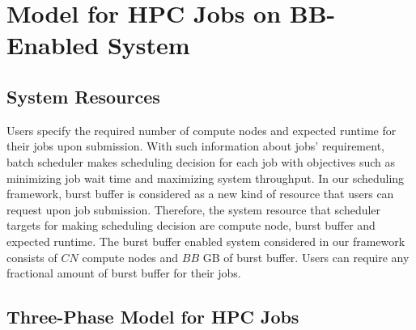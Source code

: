 \section{Model for HPC Jobs on BB-Enabled System}
\label{Sec:Model}

\subsection{System Resources}

Users specify the required number of compute nodes and expected runtime for their jobs upon submission. 
With such information about jobs' requirement, 
batch scheduler makes scheduling decision for each job with objectives 
such as minimizing job wait time and maximizing system throughput. 
In our scheduling framework, 
burst buffer is considered as a new kind of resource that users can request upon job submission. 
Therefore, the system resource that scheduler targets for making scheduling decision are compute node, 
burst buffer and expected runtime. 
The burst buffer enabled system considered in our framework consists of 
$CN$ compute nodes and $BB$ GB of burst buffer. 
Users can require any fractional amount of burst buffer for their jobs. 



\subsection{Three-Phase Model for HPC Jobs}


